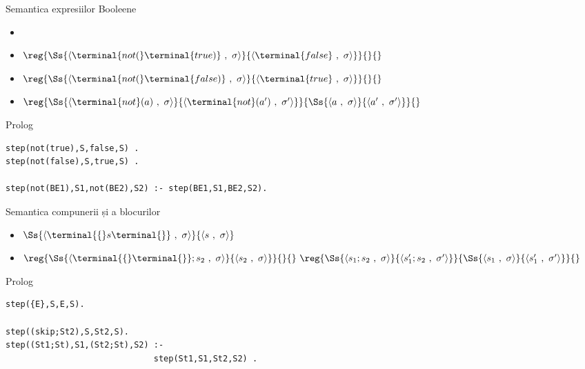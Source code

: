 \documentclass[xcolor=x11names,compress,10pt]{beamer}
\newcommand{\Conf}[2]{\ensuremath{\langle #1\ ,\ #2\rangle}}
\renewcommand{\to}{}
\begin{document}
\begin{frame}[fragile]{Semantica expresiilor Booleene}
\vspace*{0.5cm}
 
 
    \begin{itemize}
  \item {} 
   
  \item[] $\reg{\Ss{\Conf{\terminal{not(} \terminal{true)}}{\sigma}}\to{\Conf{\terminal{false}}{\sigma}}}{}{}$
    
  \item[] $\reg{\Ss{\Conf{\terminal{not(} \terminal{false)}}{\sigma}}\to{\Conf{\terminal{true}}{\sigma}}}{}{}$
   \medskip
  \item[] $\reg{\Ss{\Conf{\terminal{not}(a)}{\sigma}}\to{\Conf{\terminal{not}(a')}{\sigma'}}}{\Ss{\Conf{a}{\sigma}}\to{\Conf{a'}{\sigma'}}}{}$
\end{itemize}
 
  \begin{block}{Prolog}  
  \begin{verbatim}
step(not(true),S,false,S) .
step(not(false),S,true,S) .

step(not(BE1),S1,not(BE2),S2) :- step(BE1,S1,BE2,S2).
  \end{verbatim}
  \end{block}
  \end{frame}
  \begin{frame}[fragile]{Semantica compunerii și a blocurilor}
\vspace*{0.5cm}
 
 
    \begin{itemize}
  \item {} 
  
  $\Ss{\Conf{\terminal{\{} s \terminal{\}}}{\sigma}}\to{\Conf{ s}{\sigma}}$
  
  
  
   \item {}
   
   $\reg{\Ss{\Conf{\terminal{\{}\terminal{\}} ; s_2}{\sigma}}\to{\Conf{s_2}{\sigma}}}{}{}\,\,\reg{\Ss{\Conf{s_1 ; s_2}{\sigma}}\to{\Conf{s_1' ; s_2}{\sigma'}}}{\Ss{\Conf{s_1}{\sigma}}\to{\Conf{s_1'}{\sigma'}}}{}$
\end{itemize}
 
  \begin{block}{Prolog}  
  \begin{verbatim}
step({E},S,E,S).

step((skip;St2),S,St2,S).
step((St1;St),S1,(St2;St),S2) :-
                              step(St1,S1,St2,S2) .
  \end{verbatim}
  \end{block}
  \end{frame}  
\end{document}
